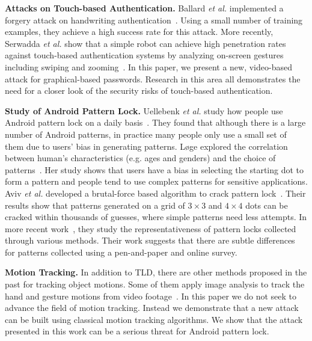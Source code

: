 \vspace{2mm}
\noindent \textbf{Attacks on Touch-based Authentication.}
Ballard \emph{et al.} implemented a forgery attack on handwriting
authentication~\cite{ballard2007forgery}. Using a small number of training
examples, they achieve a high success rate for this attack. More recently,
Serwadda \emph{et al.} show that a simple robot can achieve high penetration
rates against touch-based authentication systems by analyzing on-screen gestures including
swiping and zooming~\cite{serwadda2013kids}.
In this paper, we present a new, video-based attack for graphical-based passwords.
Research in this area all demonstrates the need for a closer look of the security risks of touch-based authentication.


\vspace{2mm}
\noindent \textbf{Study of Android Pattern Lock.}
Uellebenk \emph{et al.} study how people use Android pattern lock on
a daily basis~\cite{uellenbeck2013quantifying}.  They found that although there
is a large number of Android patterns, in
practice many people only use a small set of them due to users' bias in
generating patterns. L{\o}ge explored the correlation between
human's characteristics (e.g. ages and genders) and the choice of
patterns~\cite{alpnorway}. Her study shows that users have a bias in selecting the
starting dot to form a pattern and people tend to use complex patterns
for sensitive applications.
Aviv \emph{et al.} developed a brutal-force based algorithm to
crack pattern lock~\cite{Aviv2015Is}. Their results show that patterns
generated on a grid of $3\times3$ and $4\times4$ dots can be cracked
within thousands of guesses, where simple patterns need less
attempts. In more recent work~\cite{Aviv2016Anlyzing}, they study the representativeness of
pattern locks collected through various methods. Their work suggests
that there are subtle differences for patterns collected using a pen-and-paper
 and online survey.

\vspace{2mm}
\noindent \textbf{Motion Tracking.} In addition to TLD, there are other methods proposed in the past for tracking object
motions. Some of them apply image analysis to track the hand and gesture
motions from video
footage~\cite{Yang:2002:EMT:605089.605095,Stenger:2006:MHT:1159166.1159342,
citeulike:13091082}. In this paper we do not seek to advance the field of
motion tracking. Instead we demonstrate that a new attack can be built
using classical motion tracking algorithms. We show that the attack presented in
this work can be a serious threat for Android pattern lock. %


